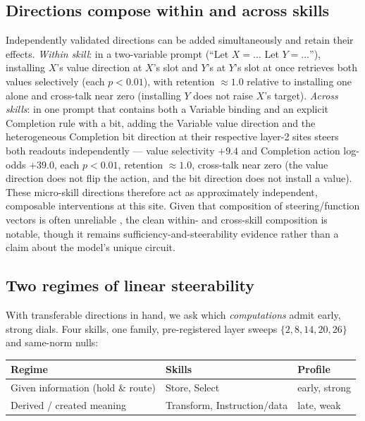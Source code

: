 \documentclass[10pt]{article}
\begin{document}
\subsection{Directions compose within and across skills}

Independently validated directions can be added simultaneously and retain their
effects. \emph{Within skill}: in a two-variable prompt (``Let $X=\ldots$
Let $Y=\ldots$''), installing $X$'s value direction at $X$'s slot and $Y$'s at
$Y$'s slot at once retrieves both values selectively (each $p<0.01$), with
retention $\approx1.0$ relative to installing one alone and cross-talk near zero
(installing $Y$ does not raise $X$'s target). \emph{Across skills}: in one prompt
that contains both a Variable binding and an explicit Completion rule with a bit,
adding the Variable value direction and the heterogeneous Completion bit
direction at their respective layer-2 sites steers both readouts independently
--- value selectivity $+9.4$ and Completion action log-odds $+39.0$, each
$p<0.01$, retention $\approx1.0$, cross-talk near zero (the value direction does
not flip the action, and the bit direction does not install a value). These
micro-skill directions therefore act as approximately independent, composable
interventions at this site. Given that composition of steering/function vectors
is often unreliable \citep{todd2024function,tan2024generalisation}, the clean
within- and cross-skill composition is notable, though it remains
sufficiency-and-steerability evidence rather than a claim about the model's
unique circuit.

\subsection{Two regimes of linear steerability}

With transferable directions in hand, we ask which \emph{computations} admit
early, strong dials. Four skills, one family, pre-registered layer sweeps
$\{2,8,14,20,26\}$ and same-norm nulls:

\begin{center}
\begin{tabular}{@{}lll@{}}
\toprule
Regime & Skills & Profile \\
\midrule
Given information (hold \& route) & Store, Select & early, strong \\
Derived / created meaning & Transform, Instruction/data & late, weak \\
\bottomrule
\end{tabular}
\end{center}
\end{document}
